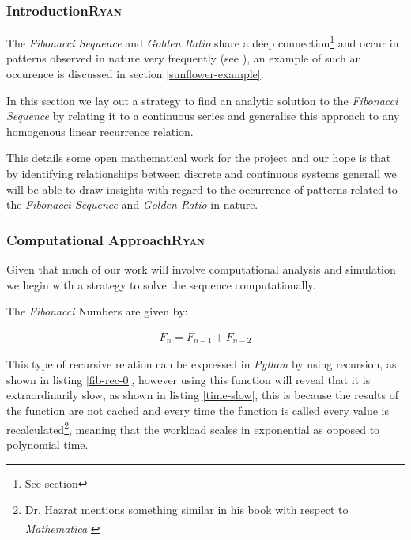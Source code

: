 \documentclass[11pt]{article}
\begin{document}
\subsubsection{Introduction\hfill{}\textsc{Ryan}}
\label{sec:org750208b}
The \emph{Fibonacci Sequence} and \emph{Golden Ratio} share a deep connection\footnote{See section} and occur in patterns observed in nature very frequently
(see
\cite{shellyallenFibonacciNature,benedettapalazzoNumbersNatureFibonacci2016,MinarovaNikoletta2014TFSN,NatureGoldenRatio2018,robertlambHowAreFibonacci2008,ronknottFibonacciNumbersGolden2016}), an example of such an occurence is discussed in section \ref{sunflower-example}.


In this section we lay out a strategy to find an analytic solution to the
\emph{Fibonacci Sequence} by relating it to a continuous series and generalise this
approach to any homogenous linear recurrence relation.

This details some open mathematical work for the project and our hope is that by
identifying relationships between discrete and continuous systems generall we
will be able to draw insights with regard to the occurrence of patterns related
to the \emph{Fibonacci Sequence} and \emph{Golden Ratio} in nature.

\subsubsection{Computational Approach\hfill{}\textsc{Ryan}}
\label{define-the-fibonacci-numbers}
Given that much of our work will involve computational analysis and simulation we begin with a strategy to solve the sequence computationally.

The \emph{Fibonacci} Numbers are given by:

\begin{align}
F_n = F_{n-1} + F_{n-2} \label{eq:fib-def}
\end{align}

This type of recursive relation can be expressed in \emph{Python} by using recursion,
as shown in listing \ref{fib-rec-0}, however using this function will reveal that it
is extraordinarily slow, as shown in listing \ref{time-slow}, this is because the
results of the function are not cached and every time the function is called
every value is recalculated\footnote{Dr. Hazrat mentions something similar in his book with respect to
\emph{Mathematica}\textsuperscript{\textregistered}
\cite[Ch. 13]{hazratMathematicaProblemCenteredApproach2015}}, meaning that the workload scales in
exponential as opposed to polynomial time.
\end{document}
